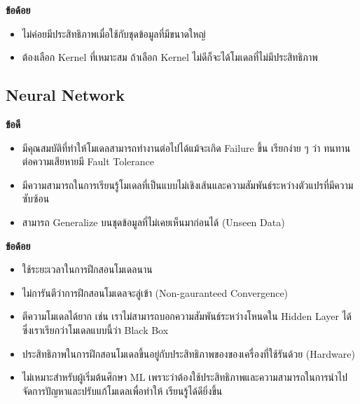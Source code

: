 \noindent \textbf{ข้อด้อย}
\begin{itemize}[topsep=0pt]
    \item ไม่ค่อยมีประสิทธิภาพเมื่อใช้กับชุดข้อมูลที่มีขนาดใหญ่
    
    \item ต้องเลือก Kernel ที่เหมาะสม ถ้าเลือก Kernel ไม่ดีก็จะได้โมเดลที่ไม่มีประสิทธิภาพ
\end{itemize}

\subsection{Neural Network}
\label{ssec:pros_cons_nn}

\noindent \textbf{ข้อดี}
\begin{itemize}[topsep=0pt]
    \item มีคุณสมบัติที่ทำให้โมเดลสามารถทำงานต่อไปได้แม้จะเกิด Failure ขึ้น เรียกง่าย ๆ ว่า ทนทานต่อความเสียหายมี Fault Tolerance
    
    \item มีความสามารถในการเรียนรู้โมเดลที่เป็นแบบไม่เชิงเส้นและความสัมพันธ์ระหว่างตัวแปรที่มีความซับซ้อน
    
    \item สามารถ Generalize บนชุดข้อมูลที่ไม่เคยเห็นมาก่อนได้ (Unseen Data)
\end{itemize}

\noindent \textbf{ข้อด้อย}
\begin{itemize}[topsep=0pt]
    \item ใช้ระยะเวลาในการฝึกสอนโมเดลนาน
    
    \item ไม่การันตีว่าการฝึกสอนโมเดลจะลู่เข้า (Non-gauranteed Convergence)
    
    \item ตีความโมเดลได้ยาก เช่น เราไม่สามารถบอกความสัมพันธ์ระหว่างโหนดใน Hidden Layer ได้ ซึ่งเราเรียกว่าโมเดลแบบนี้ว่า Black 
    Box 

    \item ประสิทธิภาพในการฝึกสอนโมเดลขึ้นอยู่กับประสิทธิภาพของของเครื่องที่ใช้รันด้วย (Hardware)
    
    \item ไม่เหมาะสำหรับผู้เริ่มต้นศึกษา ML เพราะว่าต้องใช้ประสิทธิภาพและความสามารถในการนำไปจัดการปัญหาและปรับแก้โมเดลเพื่อทำให้%
    เรียนรู้ได้ดียิ่งขึ้น
\end{itemize}

